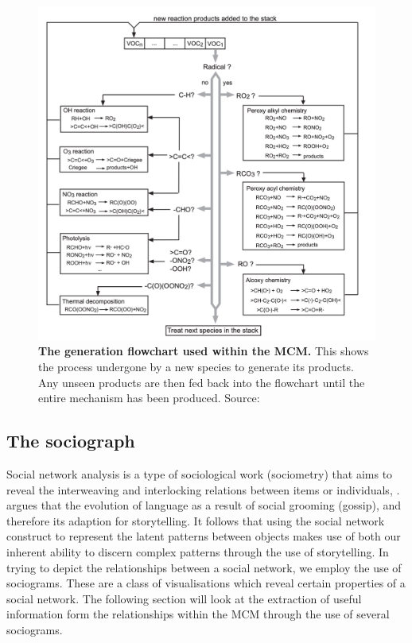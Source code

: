 \begin{figure}[H]
     \centering
         \centering
         \includegraphics[width=.96\textwidth]{figures_c1/generation.png}
         \caption{\textbf{The generation flowchart used within the MCM.} This shows the process undergone by a new species to generate its products. Any unseen products are then fed back into the flowchart until the entire mechanism has been produced.  Source:\citep{protocol}}
         \label{fig:protocol}
     \end{figure}


\subsection{The sociograph}
Social network analysis is a type of sociological work (sociometry) that aims to reveal the interweaving and interlocking relations between items or individuals, \citep{socialorigin}. \citep{gossip} argues that the evolution of language as a result of social grooming (gossip), and therefore its adaption for storytelling. It follows that using the social network construct to represent the latent patterns between objects makes use of both our inherent ability to discern complex patterns through the use of storytelling. In trying to depict the relationships between a social network, we employ the use of sociograms. These are a class of visualisations which reveal certain properties of a social network. The following section will look at the extraction of useful information form the relationships within the MCM through the use of several sociograms.

